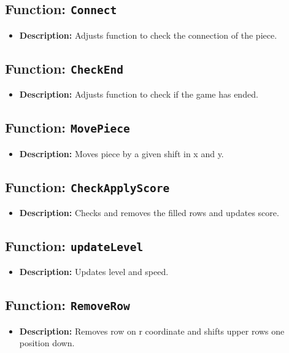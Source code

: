 \documentclass{article}
\begin{document}
\subsection{Function: \texttt{Connect}}
\begin{itemize}
    \item \textbf{Description:} Adjusts function to check the connection of the piece.
\end{itemize}

\subsection{Function: \texttt{CheckEnd}}
\begin{itemize}
    \item \textbf{Description:} Adjusts function to check if the game has ended.
\end{itemize}

\subsection{Function: \texttt{MovePiece}}
\begin{itemize}
    \item \textbf{Description:} Moves piece by a given shift in x and y.
\end{itemize}

\subsection{Function: \texttt{CheckApplyScore}}
\begin{itemize}
    \item \textbf{Description:} Checks and removes the filled rows and updates score.
\end{itemize}

\subsection{Function: \texttt{updateLevel}}
\begin{itemize}
    \item \textbf{Description:} Updates level and speed.
\end{itemize}

\subsection{Function: \texttt{RemoveRow}}
\begin{itemize}
    \item \textbf{Description:} Removes row on r coordinate and shifts upper rows one position down.
\end{itemize}
\end{document}
